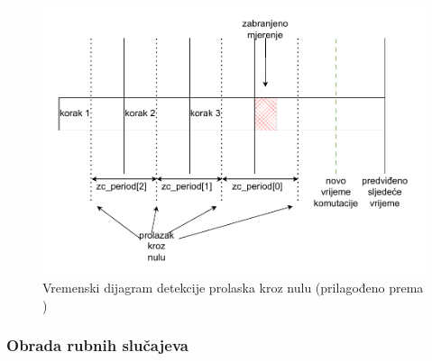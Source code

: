 \documentclass[diplomskirad]{fer}
\begin{document}
\begin{figure}[h!]
	\centering
	\includegraphics[width=\textwidth]{csv/closed_loop_zc.pdf}
	\caption{Vremenski dijagram detekcije prolaska kroz nulu (prilagođeno prema \cite{NXP_AN2355})}
	\label{fig:closed_loop_zc}
\end{figure}

\subsubsection{Obrada rubnih slučajeva}
\label{sssec:rubni_slucajevi}
\end{document}
